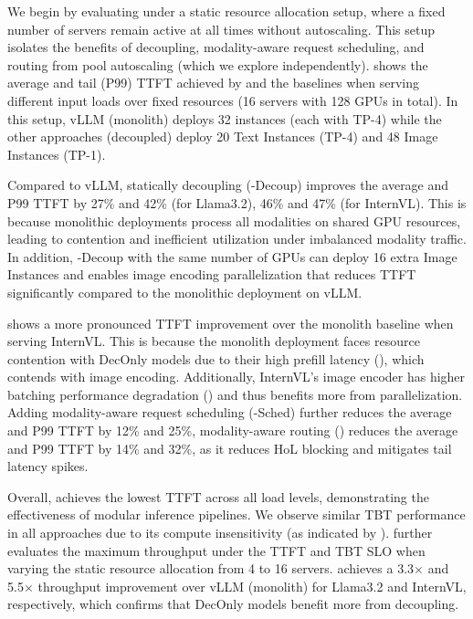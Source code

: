 

We begin by evaluating \sysname{} under a static resource allocation setup, where a fixed number of servers remain active at all times without autoscaling.
This setup isolates the benefits of decoupling, modality-aware request scheduling, and routing from pool autoscaling (which we explore independently).
 shows the average and tail (P99) TTFT achieved by \sysname{} and the baselines when serving different input loads over fixed resources (16 servers with 128 GPUs in total).
In this setup, vLLM (monolith) deploys 32 instances (each with TP-4) while the other approaches (decoupled) deploy 20 Text Instances (TP-4) and 48 Image Instances (TP-1).

Compared to vLLM, statically decoupling (\sysname{}-Decoup) improves the average and P99 TTFT by 27\% and 42\% (for Llama3.2), 46\% and 47\% (for InternVL).
This is because monolithic deployments process all modalities on shared GPU resources, leading to contention and inefficient utilization under imbalanced modality traffic. 
In addition, \sysname{}-Decoup with the same number of GPUs can deploy 16 extra Image Instances and enables image encoding parallelization that reduces TTFT significantly compared to the monolithic deployment on vLLM.

\sysname{} shows a more pronounced TTFT improvement over the monolith baseline when serving InternVL.
This is because the monolith deployment faces resource contention with DecOnly models due to their high prefill latency (), which contends with image encoding.
Additionally, InternVL's image encoder has higher batching performance degradation () and thus benefits more from parallelization.
Adding modality-aware request scheduling (\sysname{}-Sched) further reduces the average and P99 TTFT by 12\% and 25\%, modality-aware routing (\sysname{}) reduces the average and P99 TTFT by 14\% and 32\%, as it reduces HoL blocking and mitigates tail latency spikes.

Overall, \sysname{} achieves the lowest TTFT across all load levels, demonstrating the effectiveness of modular inference pipelines.
We observe similar TBT performance in all approaches due to its compute insensitivity (as indicated by ).
 further evaluates the maximum throughput under the TTFT and TBT SLO when varying the static resource allocation from 4 to 16 servers.
\sysname{} achieves a 3.3$\times$ and 5.5$\times$ throughput improvement over vLLM (monolith) for Llama3.2 and InternVL, respectively, which confirms that DecOnly models benefit more from decoupling. 

